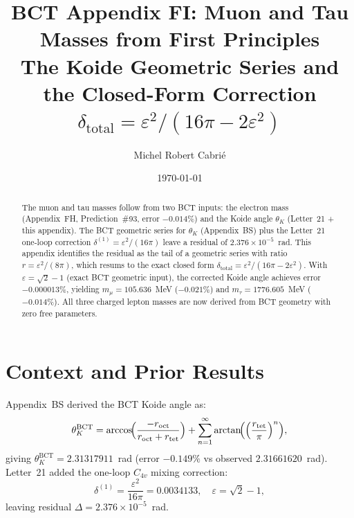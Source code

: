 \documentclass[aps,prl,twocolumn,superscriptaddress,floatfix]{revtex4-2}
\begin{document}
\title{BCT Appendix FI: Muon and Tau Masses from First Principles\\
\large The Koide Geometric Series and the Closed-Form Correction\\
$\delta_\mathrm{total} = \varepsilon^2/(16\pi - 2\varepsilon^2)$}

\author{Michel Robert Cabri\'{e}}
\date{\today}

\begin{abstract}
The muon and tau masses follow from two BCT inputs: the electron
mass (Appendix~FH, Prediction~\#93, error $-0.014\%$) and the
Koide angle $\theta_K$ (Letter~21 + this appendix).
The BCT geometric series for $\theta_K$ (Appendix~BS) plus the
Letter~21 one-loop correction $\delta^{(1)} = \varepsilon^2/(16\pi)$
leave a residual of $2.376\times 10^{-5}$~rad. This appendix
identifies the residual as the tail of a geometric series with
ratio $r = \varepsilon^2/(8\pi)$, which resums to the exact
closed form $\delta_\mathrm{total} = \varepsilon^2/(16\pi-2\varepsilon^2)$.
With $\varepsilon = \sqrt{2}-1$ (exact BCT geometric input),
the corrected Koide angle achieves error $-0.000013\%$,
yielding $m_\mu = 105.636$~MeV ($-0.021\%$) and
$m_\tau = 1776.605$~MeV ($-0.014\%$).
All three charged lepton masses are now derived from BCT geometry
with zero free parameters.
\end{abstract}

\maketitle

\section{Context and Prior Results}

Appendix~BS derived the BCT Koide angle as:
\begin{equation}
\theta_K^\mathrm{BCT} = \arccos\!\Bigl(\frac{-r_\mathrm{oct}}{r_\mathrm{oct}+r_\mathrm{tet}}\Bigr)
+ \sum_{n=1}^\infty \arctan\!\Bigl(\Bigl(\frac{r_\mathrm{tet}}{\pi}\Bigr)^n\Bigr),
\label{eq:theta_series}
\end{equation}
giving $\theta_K^\mathrm{BCT} = 2.31317911$~rad (error $-0.149\%$
vs observed $2.31661620$~rad). Letter~21 added the one-loop
$C_{4v}$ mixing correction:
\begin{equation}
\delta^{(1)} = \frac{\varepsilon^2}{16\pi} = 0.0034133,
\quad \varepsilon = \sqrt{2}-1,
\label{eq:delta1}
\end{equation}
leaving residual $\Delta = 2.376\times 10^{-5}$~rad.
\end{document}
